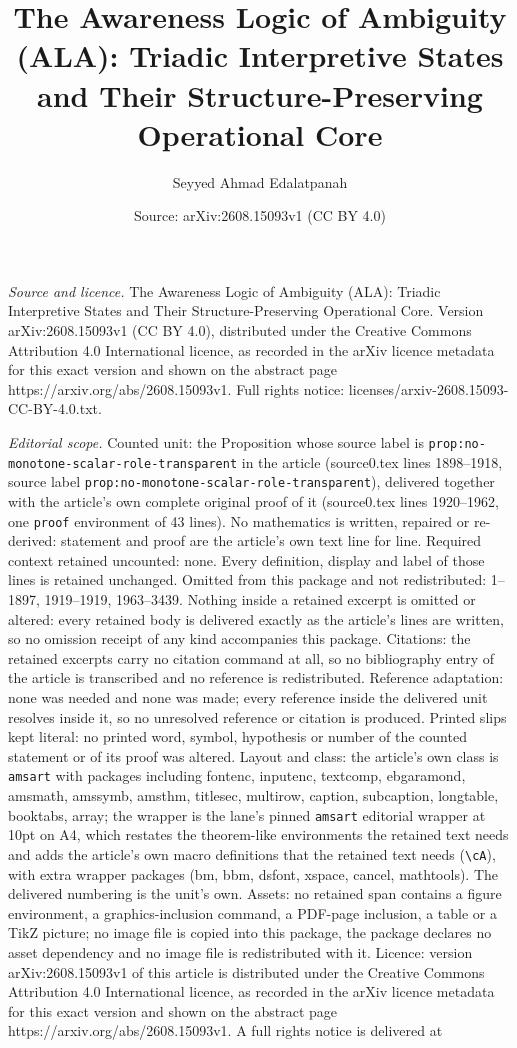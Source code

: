 \documentclass[10pt,a4paper]{amsart}
\title[The Awareness Logic of Ambiguity (ALA): Triadic Interpretive]{The Awareness Logic of Ambiguity (ALA): Triadic Interpretive States and Their Structure-Preserving Operational Core}
\author{Seyyed Ahmad Edalatpanah}
\date{Source: arXiv:2608.15093v1 (CC BY 4.0)}
\begin{document}
\maketitle

\noindent\emph{Source and licence.} The Awareness Logic of Ambiguity (ALA): Triadic Interpretive States and Their Structure-Preserving Operational Core. Version arXiv:2608.15093v1 (CC BY 4.0), distributed under the Creative Commons Attribution 4.0 International licence, as recorded in the arXiv licence metadata for this exact version and shown on the abstract page https://arxiv.org/abs/2608.15093v1. Full rights notice: licenses/arxiv-2608.15093-CC-BY-4.0.txt.\par\smallskip

\noindent\textit{Editorial scope.} Counted unit: the Proposition whose source label is \texttt{prop:no-monotone-scalar-role-transparent} in the article (source0.tex lines 1898--1918, source label \texttt{prop:no-monotone-scalar-role-transparent}), delivered together with the article's own complete original proof of it (source0.tex lines 1920--1962, one \texttt{proof} environment of 43 lines). No mathematics is written, repaired or re-derived: statement and proof are the article's own text line for line. Required context retained uncounted: none. Every definition, display and label of those lines is retained unchanged. Omitted from this package and not redistributed: 1--1897, 1919--1919, 1963--3439. Nothing inside a retained excerpt is omitted or altered: every retained body is delivered exactly as the article's lines are written, so no omission receipt of any kind accompanies this package. Citations: the retained excerpts carry no citation command at all, so no bibliography entry of the article is transcribed and no reference is redistributed. Reference adaptation: none was needed and none was made; every reference inside the delivered unit resolves inside it, so no unresolved reference or citation is produced. Printed slips kept literal: no printed word, symbol, hypothesis or number of the counted statement or of its proof was altered. Layout and class: the article's own class is \texttt{amsart} with packages including fontenc, inputenc, textcomp, ebgaramond, amsmath, amssymb, amsthm, titlesec, multirow, caption, subcaption, longtable, booktabs, array; the wrapper is the lane's pinned \texttt{amsart} editorial wrapper at 10pt on A4, which restates the theorem-like environments the retained text needs and adds the article's own macro definitions that the retained text needs (\texttt{\textbackslash cA}), with extra wrapper packages (bm, bbm, dsfont, xspace, cancel, mathtools). The delivered numbering is the unit's own. Assets: no retained span contains a figure environment, a graphics-inclusion command, a PDF-page inclusion, a table or a TikZ picture; no image file is copied into this package, the package declares no asset dependency and no image file is redistributed with it. Licence: version arXiv:2608.15093v1 of this article is distributed under the Creative Commons Attribution 4.0 International licence, as recorded in the arXiv licence metadata for this exact version and shown on the abstract page https://arxiv.org/abs/2608.15093v1. A full rights notice is delivered at 
\end{document}
